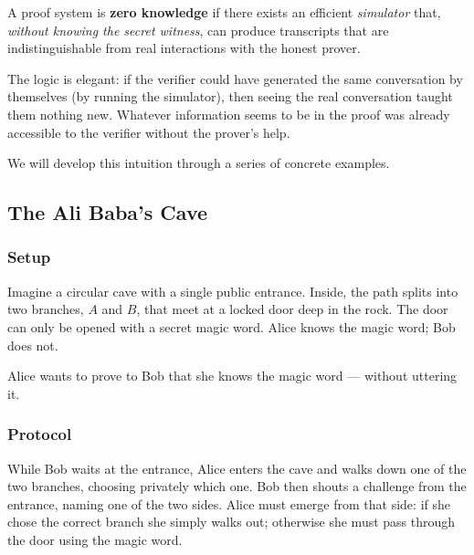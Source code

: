\begin{tcolorbox}[colback=blue!4!white,colframe=blue!45!black]
  A proof system is \textbf{zero knowledge} if there exists an efficient \emph{simulator} that, \emph{without knowing the secret witness}, can produce transcripts that are indistinguishable from real interactions with the honest prover.
\end{tcolorbox}

The logic is elegant: if the verifier could have generated the same conversation by themselves (by running the simulator), then seeing the real conversation taught them nothing new. Whatever information seems to be in the proof was already accessible to the verifier without the prover's help.

We will develop this intuition through a series of concrete examples.

\subsection{The Ali Baba's Cave}

\subsubsection{Setup}

Imagine a circular cave with a single public entrance. Inside, the path splits into two branches, $A$ and $B$, that meet at a locked door deep in the rock. The door can only be opened with a secret magic word. Alice knows the magic word; Bob does not.

Alice wants to prove to Bob that she knows the magic word --- without uttering it.

\subsubsection{Protocol}

While Bob waits at the entrance, Alice enters the cave and walks down one of the two branches, choosing privately which one. Bob then shouts a challenge from the entrance, naming one of the two sides. Alice must emerge from that side: if she chose the correct branch she simply walks out; otherwise she must pass through the door using the magic word.

